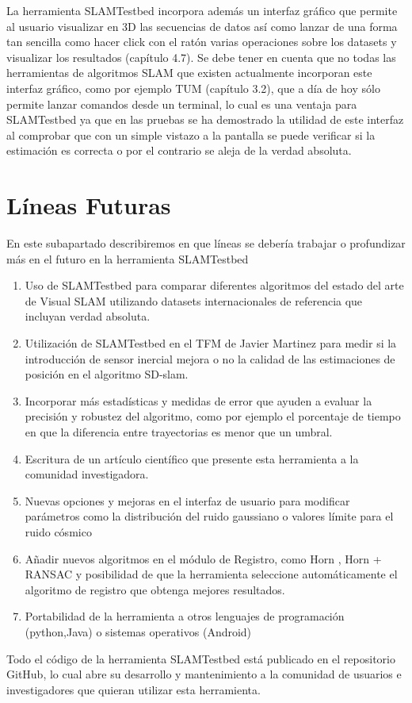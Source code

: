 La herramienta SLAMTestbed incorpora además un interfaz gráfico que permite al usuario visualizar en 3D las secuencias de datos así como lanzar de una forma tan sencilla como hacer click con el ratón varias operaciones sobre los datasets y visualizar los resultados (capítulo 4.7). Se debe tener en cuenta que no todas las herramientas de algoritmos SLAM que existen actualmente incorporan este interfaz gráfico, como por ejemplo TUM (capítulo 3.2), que a día de hoy sólo permite lanzar comandos desde un terminal, lo cual es una ventaja para SLAMTestbed ya que en las pruebas se ha demostrado la utilidad de este interfaz al comprobar que con un simple vistazo a la pantalla se puede verificar si la estimación es correcta o por el contrario se aleja de la verdad absoluta.


\section{Líneas Futuras}

En este subapartado describiremos en que líneas se debería trabajar o profundizar más en el futuro en la herramienta SLAMTestbed

\begin{enumerate}

\item{Uso de SLAMTestbed para comparar diferentes algoritmos del estado del arte de Visual SLAM utilizando datasets internacionales de referencia que incluyan verdad absoluta.}

\item{Utilización de SLAMTestbed en el TFM de Javier Martinez para medir si la introducción de sensor inercial mejora o no la calidad de las estimaciones de posición en el algoritmo SD-slam.}

\item{Incorporar más estadísticas y medidas de error que ayuden a evaluar la precisión y robustez del algoritmo, como por ejemplo el porcentaje de tiempo en que la diferencia entre trayectorias es menor que un umbral.}

\item{Escritura de un artículo científico que presente esta herramienta a la comunidad investigadora.}

\item{Nuevas opciones y mejoras en el interfaz de usuario para modificar parámetros como la distribución del ruido gaussiano o valores límite para el ruido cósmico}

\item{Añadir nuevos algoritmos en el módulo de Registro, como Horn , Horn + RANSAC y posibilidad de que la herramienta seleccione automáticamente el algoritmo de registro que 
obtenga mejores resultados.}

\item{Portabilidad de la herramienta a otros lenguajes de programación (python,Java) o sistemas operativos (Android)}

\end{enumerate}

Todo el código de la herramienta SLAMTestbed está publicado en el repositorio GitHub, lo cual abre su desarrollo y mantenimiento a la comunidad de usuarios e investigadores que quieran utilizar esta herramienta.


